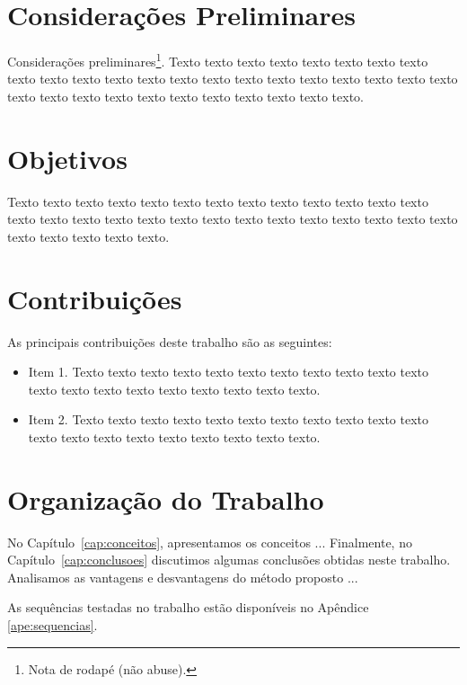 


\section{Considerações Preliminares}
\label{sec:consideracoes_preliminares}

Considerações preliminares\footnote{Nota de rodapé (não abuse).}.
Texto texto texto texto texto texto texto texto texto texto texto texto texto
texto texto texto texto texto texto texto texto texto texto texto texto texto
texto texto texto texto texto texto texto.
 

\section{Objetivos}
\label{sec:objetivo}

Texto texto texto texto texto texto texto texto texto texto texto texto texto
texto texto texto texto texto texto texto texto texto texto texto texto texto
texto texto texto texto texto texto.

\section{Contribuições}
\label{sec:contribucoes}

As principais contribuições deste trabalho são as seguintes:

\begin{itemize}
  \item Item 1. Texto texto texto texto texto texto texto texto texto texto
  texto texto texto texto texto texto texto texto texto texto.

  \item Item 2. Texto texto texto texto texto texto texto texto texto texto
  texto texto texto texto texto texto texto texto texto texto.

\end{itemize}

\section{Organização do Trabalho}
\label{sec:organizacao_trabalho}

No Capítulo~\ref{cap:conceitos}, apresentamos os conceitos ... Finalmente, no
Capítulo~\ref{cap:conclusoes} discutimos algumas conclusões obtidas neste
trabalho. Analisamos as vantagens e desvantagens do método proposto ... 

As sequências testadas no trabalho estão disponíveis no Apêndice \ref{ape:sequencias}.
